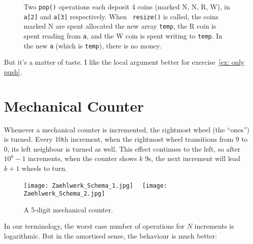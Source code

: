 \documentclass{tufte-handout}
\begin{document}
\begin{figure}
  \caption{ Two {\tt pop()} operations each deposit 4 coins (marked N, N, R,
    W), in {\tt a[2]} and {\tt a[3]} respectively.  When {\tt
      resize()} is called, the coins marked N are spent allocated the
    new array {\tt temp}, the R coin is spent reading from {\tt a},
    and the W coin is spent writing to {\tt temp}. In the new {\tt a}
    (which is {\tt temp}), there is no money.  }
\end{figure}

But it's a matter of taste. I like the local argument better for
exercise~\ref{ex: only push}.


\section{Mechanical Counter}

Whenever a mechanical counter is incremented, the rightmost wheel (the
``ones'') is turned. Every 10th increment, when the rightmost wheel
transitions from 9 to 0, its left neighbour is turned as well. This
effect continues to the left, so after $10^k-1$ increments, when the
counter shows $k$ 9s, the next increment will lead $k+1$ wheels to
turn.

\begin{figure}[htb]
\centerline{\texttt{[image: Zaehlwerk\_Schema\_1.jpg]}
$\quad$\texttt{[image: Zaehlwerk\_Schema\_2.jpg]}}
\caption{A 5-digit mechanical counter.}
\end{figure}

In our terminology, the worst case number of operations for $N$
increments is logarithmic. But in the amortised sense, the behaviour
is much better:
\end{document}
